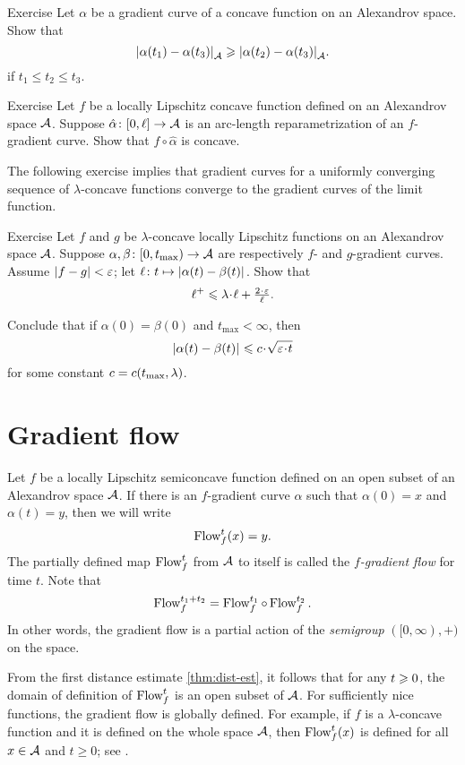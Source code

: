 \begin{thm}{Exercise}\label{ex:elf-contracting}
Let $\alpha$ be a gradient curve of a concave function on an Alexandrov space.
Show that
\[|{\alpha(t_1)}-{\alpha(t_3)}|_{\mathcal{A}}^{{}}\geqslant |{\alpha(t_2)}-{\alpha(t_3)}|_{\mathcal{A}}^{{}}.\]
if $t_1\le t_2\le t_3$.
\end{thm}

\begin{thm}{Exercise}\label{ex:mayer}
Let $f$ be a locally Lipschitz concave function defined on an Alexandrov space $\mathcal{A}$.
Suppose $\hat\alpha\colon[0,\ell]\to\mathcal{A}$ is an arc-length reparametrization of an $f$-gradient curve.
Show that $f\circ\hat\alpha$ is concave.
\end{thm}




The following exercise implies that gradient curves for a uniformly converging sequence of $\lambda$-concave functions converge to the gradient curves of the limit function.

\begin{thm}{Exercise}\label{lem:fg-dist-est}
Let $f$ and $g$ be $\lambda$-concave locally Lipschitz functions on an Alexandrov space $\mathcal{A}$.
Suppose
$\alpha,\beta\colon[0,t_{\max})\to \mathcal{A}$ are respectively $f$- and $g$-gradient curves.
Assume $|f-g|<\varepsilon$; let $\ell\colon t\mapsto|{\alpha(t)}-{\beta(t)}|_{}^{{}}$.
Show that
\[\ell^+\le \lambda\cdot\ell+\tfrac{2\cdot\eps}{\ell}.\]

Conclude that if $\alpha(0)=\beta(0)$ and $t_{\max}<\infty$, then
\[\dist{\alpha(t)}{\beta(t)}{}
\le
\Const\cdot\sqrt{\eps\cdot t}\]
for some constant $c=c(t_{\max},\lambda)$.
\end{thm}

\section{Gradient flow}

Let $f$ be a locally Lipschitz semiconcave function defined on an open subset of an Alexandrov space $\mathcal{A}$.
If there is an $f$-gradient curve $\alpha$ such that $\alpha(0)=x$ and $\alpha(t)=y$,
then we will write 
\[\mathop{\rm Flow}\nolimits^t_f(x)=y.\]
The partially defined map $\mathop{\rm Flow}\nolimits^t_f$ from $\mathcal{A}$ to itself is called the \emph{$f$-gradient flow} for time $t$.
Note that
\[\mathop{\rm Flow}\nolimits^{t_1+t_2}_f=\mathop{\rm Flow}\nolimits_f^{t_1}\circ\mathop{\rm Flow}\nolimits_f^{t_2}.\]
In other words, the gradient flow is a partial action of the \textit{semigroup} $([0,\infty),+)$ on the space.
 
From the first distance estimate \ref{thm:dist-est}, 
it follows that for any $t\geqslant 0$, the domain of definition of $\mathop{\rm Flow}\nolimits^t_f$ is an open subset of $\mathcal{A}$.
For sufficiently nice functions, the gradient flow is globally defined.
For example, if $f$ is a $\lambda$-concave function and it is defined on the whole space $\mathcal{A}$, then $\mathop{\rm Flow}\nolimits^t_f(x)$ is defined for all $x\in \mathcal{A}$ and $t\ge0$;
see \cite[16.19]{alexander-kapovitch-petrunin2024}.

